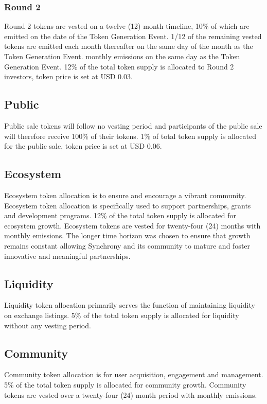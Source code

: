 \documentclass[10pt]{article}
\begin{document}
					\subsubsection{Round 2}
					Round 2 tokens are vested on a twelve (12) month timeline, 10\% of which are
					emitted on the date of the Token Generation Event. 1/12 of the remaining vested
					tokens are emitted each month thereafter on the same day of the month as the
					Token Generation Event.
					monthly emissions on the same day as the Token Generation Event. 12\% of the total
					token supply is allocated to Round 2 investors, token price is set at USD 0.03.

					\subsection{Public}
					Public sale tokens will follow no vesting period and participants of the public
					sale will therefore receive
					100\% of their tokens. 1\% of total token supply is allocated for the public sale,
					token price is set at USD 0.06.

					\subsection{Ecosystem}
					Ecosystem token allocation is to ensure and encourage a vibrant community.
					Ecosystem token allocation is specifically used to support partnerships,
					grants and development programs. 12\% of the total token
					supply is allocated for ecosystem growth. Ecosystem tokens are vested for
					twenty-four (24) months with monthly emissions. The longer time horizon
					was chosen to ensure that growth remains constant allowing Synchrony and its
					community to mature and foster innovative and meaningful partnerships.

					\subsection{Liquidity}
					Liquidity token allocation primarily serves the function of maintaining
					liquidity on exchange listings. 5\% of the total token supply is allocated for
					liquidity without any vesting period.

					\subsection{Community}
					Community token allocation is for user acquisition, engagement and management.
					5\% of the total token supply is allocated for community growth. Community
					tokens are vested over a twenty-four (24) month period with monthly emissions.
\end{document}
